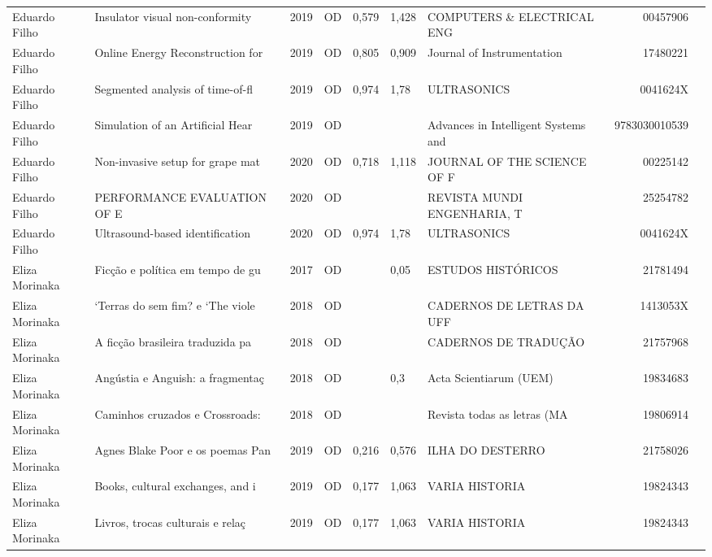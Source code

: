 \documentclass[12pt,brazil]{article}\usepackage[]{graphicx}\usepackage[]{xcolor}
\begin{document}
\begin{longtable}{lllrrllrr}
Eduardo Filho & Insulator visual non-conformity  & 2019 & OD & 0,579 & 1,428 & COMPUTERS \& ELECTRICAL ENG & 00457906 \\
Eduardo Filho & Online Energy Reconstruction for & 2019 & OD & 0,805 & 0,909 & Journal of Instrumentation & 17480221 \\
Eduardo Filho & Segmented analysis of time-of-fl & 2019 & OD & 0,974 & 1,78 & ULTRASONICS & 0041624X \\
Eduardo Filho & Simulation of an Artificial Hear & 2019 & OD &  &  & Advances in Intelligent Systems and  & 9783030010539 \\
Eduardo Filho & Non-invasive setup for grape mat & 2020 & OD & 0,718 & 1,118 & JOURNAL OF THE SCIENCE OF F & 00225142 \\
Eduardo Filho & PERFORMANCE EVALUATION OF E & 2020 & OD &  &  & REVISTA MUNDI ENGENHARIA, T & 25254782 \\
Eduardo Filho & Ultrasound-based identification  & 2020 & OD & 0,974 & 1,78 & ULTRASONICS & 0041624X \\
Eliza Morinaka & Ficção e política em tempo de gu & 2017 & OD &  & 0,05 & ESTUDOS HISTÓRICOS & 21781494 \\
Eliza Morinaka & `Terras do sem fim? e `The viole & 2018 & OD &  &  & CADERNOS DE LETRAS DA UFF & 1413053X \\
Eliza Morinaka & A ficção brasileira traduzida pa & 2018 & OD &  &  & CADERNOS DE TRADUÇÃO & 21757968 \\
Eliza Morinaka & Angústia e Anguish: a fragmentaç & 2018 & OD &  & 0,3 & Acta Scientiarum (UEM) & 19834683 \\
Eliza Morinaka & Caminhos cruzados e Crossroads:  & 2018 & OD &  &  & Revista todas as letras (MA & 19806914 \\
Eliza Morinaka & Agnes Blake Poor e os poemas Pan & 2019 & OD & 0,216 & 0,576 & ILHA DO DESTERRO & 21758026 \\
\rowcolor{coautr}\rowcolor{coautr}\rowcolor{coautr}\rowcolor{coautr}\rowcolor{coautr}\rowcolor{coautr}\rowcolor{coautr}\rowcolor{coautr}\rowcolor{coautr}\rowcolor{coautr}\rowcolor{coautr}\rowcolor{coautr}\rowcolor{coautr}\rowcolor{coautr}\rowcolor{coautr}\rowcolor{coautr}Eliza Morinaka & Books, cultural exchanges, and i & 2019 & OD & 0,177 & 1,063 & VARIA HISTORIA & 19824343 \\
\rowcolor{coautr}\rowcolor{coautr}\rowcolor{coautr}\rowcolor{coautr}\rowcolor{coautr}\rowcolor{coautr}\rowcolor{coautr}\rowcolor{coautr}\rowcolor{coautr}\rowcolor{coautr}\rowcolor{coautr}\rowcolor{coautr}\rowcolor{coautr}\rowcolor{coautr}\rowcolor{coautr}\rowcolor{coautr}Eliza Morinaka & Livros, trocas culturais e relaç & 2019 & OD & 0,177 & 1,063 & VARIA HISTORIA & 19824343 \\

\end{longtable}
\end{document}
